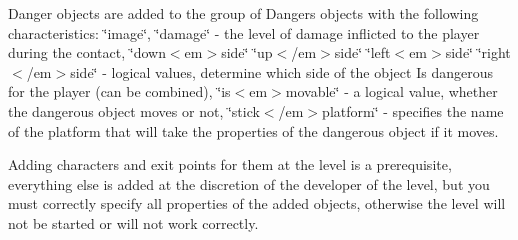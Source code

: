 Danger objects are added to the group of Dangers objects with the following characteristics\+: \char`\"{}image\char`\"{}, \char`\"{}damage\char`\"{} -\/ the level of damage inflicted to the player during the contact, \char`\"{}down$<$em$>$side\char`\"{} \char`\"{}up$<$/em$>$side\char`\"{} \char`\"{}left$<$em$>$side\char`\"{} \char`\"{}right$<$/em$>$side\char`\"{} -\/ logical values, determine which side of the object Is dangerous for the player (can be combined), \char`\"{}is$<$em$>$movable\char`\"{} -\/ a logical value, whether the dangerous object moves or not, \char`\"{}stick$<$/em$>$platform\char`\"{} -\/ specifies the name of the platform that will take the properties of the dangerous object if it moves.

Adding characters and exit points for them at the level is a prerequisite, everything else is added at the discretion of the developer of the level, but you must correctly specify all properties of the added objects, otherwise the level will not be started or will not work correctly.